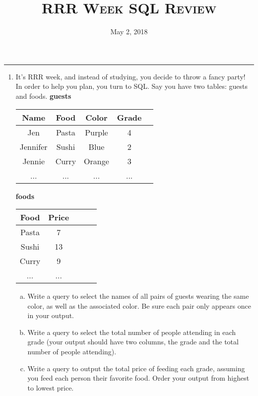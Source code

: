 \documentclass{exam}
\title{\textsc{RRR Week SQL Review}}
\date{May 2, 2018}
\begin{document}
\maketitle
\rule{\textwidth}{0.15em}
\fontsize{12}{15}\selectfont

\begin{enumerate}[1)]
\item It’s RRR week, and instead of studying, you decide to throw a fancy party! In order to help you plan, you turn to SQL.
\newline 
Say you have two tables: guests and foods. 
\newline 
\textbf{guests}
\newline
\begin{tabular}{|c|c|c|c|c|}
 \hline
 \textbf{Name} & \textbf{Food} & \textbf{Color} & \textbf{Grade} \\
 \hline
 Jen & Pasta & Purple & 4 \\
 \hline
 Jennifer & Sushi & Blue & 2 \\
 \hline
  Jennie & Curry & Orange & 3 \\
	\hline
	... & ... & ... & ...
\end{tabular}
\newline
\newline
\textbf{foods}
\newline
\begin{tabular}{|c|c|c|c|c|}
 \hline
 \textbf{Food} & \textbf{Price} \\
 \hline
 Pasta & 7\\
 \hline
 Sushi & 13 \\
 \hline
 Curry & 9 \\
 \hline
	... & ... 
\end{tabular}
\begin{enumerate}[a.]
\item Write a query to select the names of all pairs of guests wearing the same color, as well as the associated color. Be sure each pair only appears once in your output.
\vspace{2cm}
\item Write a query to select the total number of people attending in each grade (your output should have two columns, the grade and the total number of people attending).
\vspace{2cm}
\item Write a query to output the total price of feeding each grade, assuming you feed each person their favorite food. Order your output from highest to lowest price.
\vspace{2cm}

\end{enumerate}
\end{enumerate}
\end{document}
